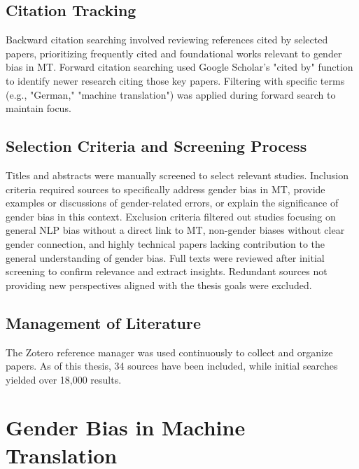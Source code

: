\subsection{Citation Tracking}
Backward citation searching involved reviewing references cited by selected papers, prioritizing frequently cited and foundational works relevant to gender bias in MT. Forward citation searching used Google Scholar's "cited by" function to identify newer research citing those key papers. Filtering with specific terms (e.g., "German," "machine translation") was applied during forward search to maintain focus.

\subsection{Selection Criteria and Screening Process}
Titles and abstracts were manually screened to select relevant studies. Inclusion criteria required sources to specifically address gender bias in MT, provide examples or discussions of gender-related errors, or explain the significance of gender bias in this context. Exclusion criteria filtered out studies focusing on general NLP bias without a direct link to MT, non-gender biases without clear gender connection, and highly technical papers lacking contribution to the general understanding of gender bias. Full texts were reviewed after initial screening to confirm relevance and extract insights. Redundant sources not providing new perspectives aligned with the thesis goals were excluded.

\subsection{Management of Literature}
The Zotero reference manager was used continuously to collect and organize papers. As of this thesis, 34 sources have been included, while initial searches yielded over 18,000 results.


\section{Gender Bias in Machine Translation}



    
    

